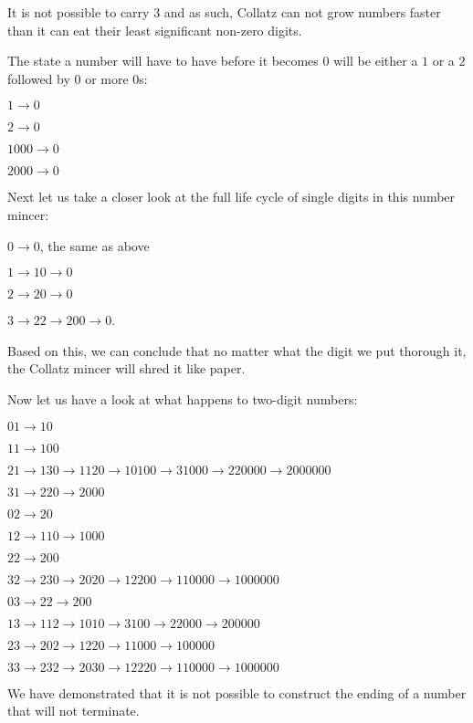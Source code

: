 \documentclass{proc-l}
\theoremstyle{definition}
\theoremstyle{remark}
\numberwithin{equation}{section}
\begin{document}
It is not possible to carry $3$ and as such, Collatz can not grow numbers faster than it can eat their least significant non-zero digits.

The state a number will have to have before it becomes $0$ will be either a $1$ or a $2$ followed by 0 or more $0$s:

$1 \rightarrow 0$ 

$2 \rightarrow 0$

$1000 \rightarrow 0$

$2000 \rightarrow 0$

Next let us take a closer look at the full life cycle of single digits in this number mincer:   

$0 \rightarrow 0$, the same as above 

$1 \rightarrow 10 \rightarrow 0$

$2 \rightarrow 20 \rightarrow 0$

$3 \rightarrow 22 \rightarrow 200 \rightarrow 0$.

Based on this, we can conclude that no matter what the digit we put thorough it, the Collatz mincer will shred it like paper.

Now let us have a look at what happens to two-digit numbers:

$01 \rightarrow 10$

$11 \rightarrow 100$

$21 \rightarrow 130 \rightarrow 1120 \rightarrow 10100 \rightarrow 31000 \rightarrow 220000 \rightarrow 2000000$

$31 \rightarrow 220 \rightarrow 2000$

$02 \rightarrow 20$

$12 \rightarrow 110 \rightarrow 1000$

$22 \rightarrow 200$

$32 \rightarrow 230 \rightarrow 2020 \rightarrow 12200 \rightarrow 110000 \rightarrow 1000000$

$03 \rightarrow 22 \rightarrow 200$

$13 \rightarrow 112 \rightarrow 1010 \rightarrow 3100 \rightarrow 22000 \rightarrow 200000$

$23 \rightarrow 202 \rightarrow 1220 \rightarrow 11000 \rightarrow 100000$

$33 \rightarrow 232 \rightarrow 2030 \rightarrow 12220 \rightarrow 110000 \rightarrow 1000000$

We have demonstrated that it is not possible to construct the ending of a number that will not terminate.
\end{document}
